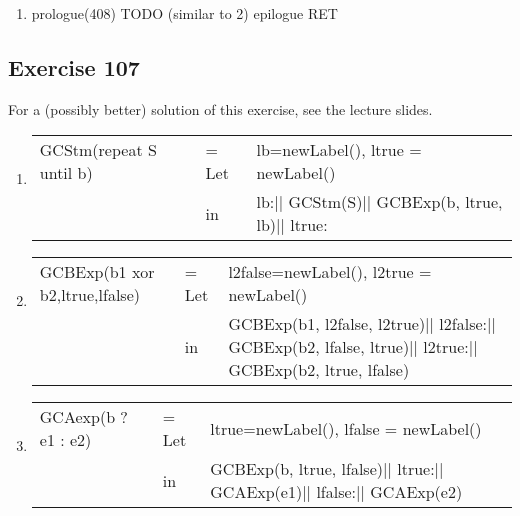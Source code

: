 \documentclass[12pt,fleqn]{article}		%
\begin{document}
\begin{enumerate}
\item
\begin{algorithmic}
\State prologue(408)
\State TODO (similar to 2) 
\State epilogue
\State RET
\end{algorithmic}

\end{enumerate}

\subsection{Exercise 107}
For a (possibly better) solution of this exercise, see the lecture slides.
\begin{enumerate}
\item 
\begin{tabularx}{\textwidth}{| X l X |}
\hline
GCStm(repeat S until b) & = Let & lb=newLabel(),\newline
ltrue = newLabel()\\
& in & 
lb:||\newline
GCStm(S)||\newline
GCBExp(b, ltrue, lb)||\newline
ltrue:
\\
\hline
\end{tabularx}
\item 
\begin{tabularx}{\textwidth}{| X l X |}
\hline
GCBExp(b1 xor b2,ltrue,lfalse) & = Let & l2false=newLabel(),\newline
l2true = newLabel()\\
& in & 
GCBExp(b1, l2false, l2true)||\newline
l2false:||\newline
GCBExp(b2, lfalse, ltrue)||\newline
l2true:||\newline
GCBExp(b2, ltrue, lfalse)
\\
\hline
\end{tabularx}
\item 
\begin{tabularx}{\textwidth}{| X l X |}
\hline
GCAexp(b ? e1 : e2) & = Let & ltrue=newLabel(),\newline
lfalse = newLabel()\\
& in & 
GCBExp(b, ltrue, lfalse)||\newline
ltrue:||\newline
GCAExp(e1)||\newline
lfalse:||\newline
GCAExp(e2)
\\
\hline
\end{tabularx}
\end{enumerate}
\end{document}
